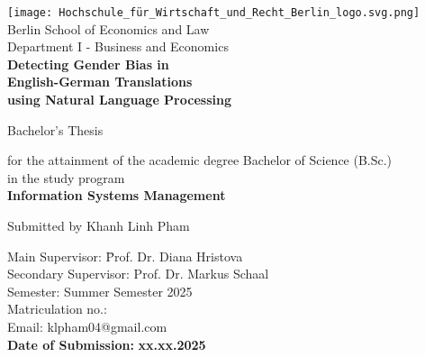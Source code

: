 \thispagestyle{empty}

\begin{center}

\vspace*{-10mm}
\texttt{[image: Hochschule\_für\_Wirtschaft\_und\_Recht\_Berlin\_logo.svg.png]}\\[10mm]

Berlin School of Economics and Law\\
Department I - Business and Economics\\[15mm]

{\Large \textbf{Detecting Gender Bias in}}\\ 
\vspace*{2mm}
{\Large \textbf{English-German Translations}}\\ 
\vspace*{2mm}
{\Large \textbf{using Natural Language Processing}}\\

\vspace*{\fill} 

{\LARGE {Bachelor's Thesis}}\\ 

\vspace*{\fill} 

for the attainment of the academic degree Bachelor of Science (B.Sc.)\\ \vspace*{1.5mm} 
in the study program\\\vspace*{1.5mm}
\textbf{Information Systems Management}\\\vspace*{1.5mm}


\vspace*{\fill} 

{\Large Submitted by Khanh Linh Pham}\\[15mm]

\vspace*{\fill} 

\begin{flushleft}
\begin{tabbing}
Main Supervisor:\hspace{1.6cm} \= Prof. Dr. Diana Hristova \\
Secondary Supervisor:\> Prof. Dr. Markus Schaal \\[4mm]
Semester:\> Summer Semester 2025\\
Matriculation no.:\\
Email:\> klpham04@gmail.com\\[8mm]
\textbf{Date of Submission:} \> \textbf{xx.xx.2025}\\
\end{tabbing}
\end{flushleft}

\end{center}

\clearpage{\pagestyle{empty}\cleardoublepage}